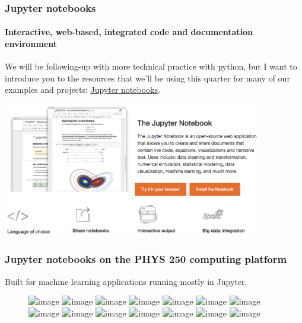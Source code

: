 \documentclass[hyperref={colorlinks=true}]{beamer}
\begin{document}
\begin{frame}[fragile]
  \frametitle{Jupyter notebooks}
  \framesubtitle{Interactive, web-based, integrated code and documentation environment}

  We will be following-up with more technical practice with python, but I want to introduce you to the resources that we'll be using this quarter for many of our examples and projects: \href{http://jupyter.org/}{Jupyter notebooks}.

  \centering
  \includegraphics[width=0.85\textwidth]{../Lecture1/JupyterNotebooks.png}
  
\end{frame}


\begin{frame}[fragile]
  \frametitle{Jupyter notebooks on the PHYS 250 computing platform}

  Built for machine learning applications running mostly in Jupyter.

  \begin{figure}
  \centering
  \includegraphics<1>[width=0.85\textwidth]{../Lecture1/Platform-homepage.png}
  \includegraphics<2>[width=0.85\textwidth]{../Lecture1/Platform-login.png}
  \includegraphics<3>[width=0.85\textwidth]{../Lecture1/Platform-homepage-loggedin.png}
  \includegraphics<4>[width=0.85\textwidth]{../Lecture1/Platform-profile.png}
  \includegraphics<5>[width=0.85\textwidth]{../Lecture1/Platform-menu.png}
  \includegraphics<6>[width=0.85\textwidth]{../Lecture1/Platform-deployments.png}
  \includegraphics<7>[width=\textwidth]{../Lecture1/Platform-configuration-lecture1.png}
  \includegraphics<8>[width=\textwidth]{../Lecture1/Platform-deployments-lecture1.png}
  \includegraphics<9>[width=\textwidth]{../Lecture1/Platform-launcher-lecture1.png}
  \includegraphics<10>[width=\textwidth]{../Lecture1/Platform-terminal-lecture1.png}
  \includegraphics<11>[width=\textwidth]{../Lecture1/Platform-launcher-lecture1-cdworkspace.png}
  \includegraphics<12>[width=\textwidth]{../Lecture1/Platform-launcher-lecture1-getGitHub.png}
  \includegraphics<13>[width=\textwidth]{../Lecture1/Platform-launcher-lecture1-clone.png}
  \includegraphics<14>[width=\textwidth]{../Lecture1/JupyterNotebook-running-maniac.png}
  \end{figure}

\end{frame}
\end{document}
